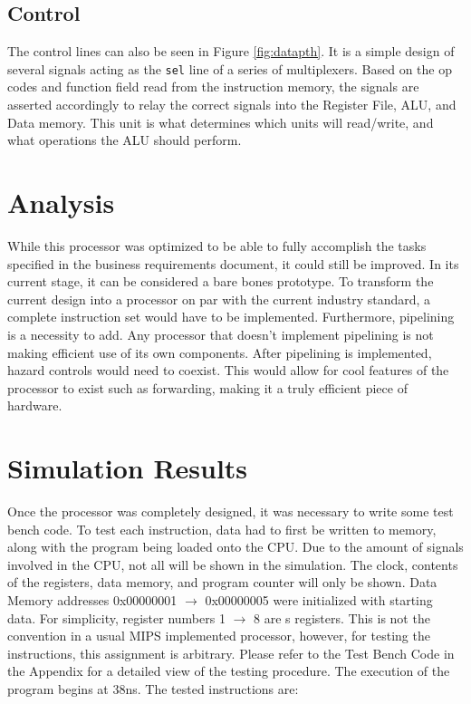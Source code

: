 \documentclass[12pt]{article}
\begin{document}
\subsection{Control}
The control lines can also be seen in Figure \ref{fig:datapth}. It is a simple design of several signals acting as the \texttt{sel} line of a series of multiplexers. Based on the op codes and function field read from the instruction memory, the signals are asserted accordingly to relay the correct signals into the Register File, ALU, and Data memory. This unit is what determines which units will read/write, and what operations the ALU should perform.
\section{Analysis}
While this processor was optimized to be able to fully accomplish the tasks specified in the business requirements document, it could still be improved. In its current stage, it can be considered a bare bones prototype. To transform the current design into a processor on par with the current industry standard, a complete instruction set would have to be implemented. Furthermore, pipelining is a necessity to add. Any processor that doesn't implement pipelining is not making efficient use of its own components. After pipelining is implemented, hazard controls would need to coexist. This would allow for cool features of the processor to exist such as forwarding, making it a truly efficient piece of hardware.
\section{Simulation Results}
Once the processor was completely designed, it was necessary to write some test bench code. To test each instruction, data had to first be written to memory, along with the program being loaded onto the CPU. Due to the amount of signals involved in the CPU, not all will be shown in the simulation. The clock, contents of the registers, data memory, and program counter will only be shown. Data Memory addresses 0x00000001 $\to$ 0x00000005 were initialized with starting data. For simplicity, register numbers 1 $\to$ 8 are s registers. This is not the convention in a usual MIPS implemented processor, however, for testing the instructions, this assignment is arbitrary. Please refer to the Test Bench Code in the Appendix for a detailed view of the testing procedure. The execution of the program begins at 38ns. The tested instructions are:
\end{document}
